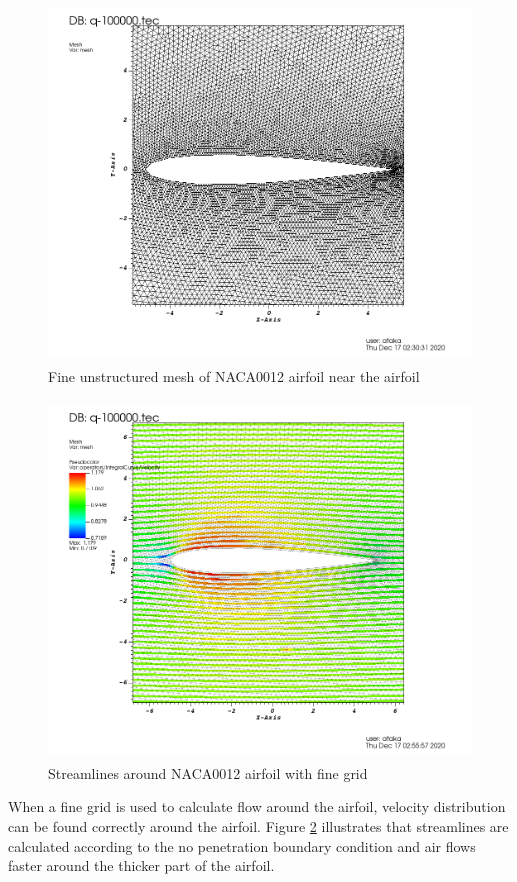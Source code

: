 \documentclass[letterpaper,12pt]{article}
\begin{document}
\begin{figure} [!h]
	\centering
	\includegraphics[height = 9.5cm]{graph/fine/fine_209480001.png}
	\caption{Fine unstructured mesh of NACA0012 airfoil near the airfoil}
    \label{fig:airfoilmeshfineclose}
\end{figure}
\begin{figure} [!h]
	\centering
	\includegraphics[height = 9.5cm]{graph/fine/fine_streamline0000.png}
	\caption{Streamlines around NACA0012 airfoil with fine grid}
    \label{fig:airfoilfinestreamline}
\end{figure}

\newpage

When a fine grid is used to calculate flow around the airfoil, velocity distribution
can be found correctly around the airfoil. Figure \ref{fig:airfoilfinestreamline} 
illustrates that streamlines are calculated according to the no penetration boundary 
condition and air flows faster around the thicker part of the airfoil.
\end{document}
